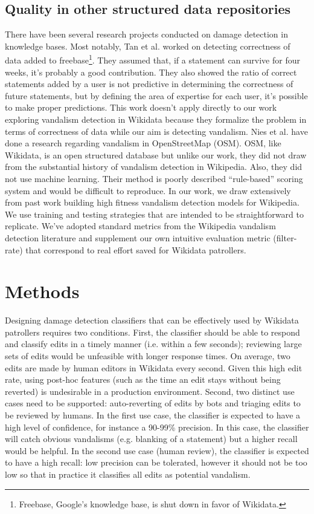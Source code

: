 \documentclass{sig-alternate-2013}
\begin{document}
\subsection{Quality in other structured data repositories}
There have been several research projects conducted on damage detection in knowledge bases. Most notably, Tan et al. \cite{tan:trust} worked on detecting correctness of data added to freebase\footnote{Freebase, Google's knowledge base, is shut down in favor of Wikidata.}. They assumed that, if a statement can survive for four weeks, it's probably a good contribution.  They also showed the ratio of correct statements added by a user is not predictive in determining the correctness of future statements, but by defining the area of expertise for each user, it's possible to make proper predictions. This work doesn't apply directly to our work exploring vandalism detection in Wikidata because they formalize the problem in terms of correctness of data while our aim is detecting vandalism. Nies et al. \cite{neis:towards} have done a research regarding vandalism in OpenStreetMap (OSM). OSM, like Wikidata, is an open structured database but unlike our work, they did not draw from the substantial history of vandalism detection in Wikipedia. Also, they did not use machine learning. Their method is poorly described ``rule-based'' scoring system and would be difficult to reproduce. In our work, we draw extensively from past work building high fitness vandalism detection models for Wikipedia. We use training and testing strategies that are intended to be straightforward to replicate.  We've adopted standard metrics from the Wikipedia vandalism detection literature and supplement our own intuitive evaluation metric (filter-rate) that correspond to real effort saved for Wikidata patrollers.

\section{Methods}
Designing damage detection classifiers that can be effectively used by Wikidata patrollers requires two conditions. First, the classifier should be able to respond and classify edits in a timely manner (i.e. within a few seconds); reviewing large sets of edits would be unfeasible with longer response times. On average, two edits are made by human editors in Wikidata every second. Given this high edit rate, using post-hoc features (such as the time an edit stays without being reverted) is undesirable in a production environment. Second, two distinct use cases need to be supported: auto-reverting of edits by bots and triaging edits to be reviewed by humans. In the first use case, the classifier is expected to have a high level of confidence, for instance a 90-99\% precision. In this case, the classifier will catch obvious vandalisms (e.g. blanking of a statement) but a higher recall would be helpful. In the second use case (human review), the classifier is expected to have a high recall: low precision can be tolerated, however it should not be too low so that in practice it classifies all edits as potential vandalism.
\end{document}
